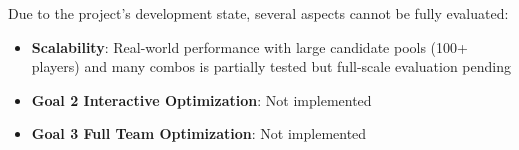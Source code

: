 Due to the project's development state, several aspects cannot be fully evaluated:

\begin{itemize}
    \item \textbf{Scalability}: Real-world performance with large candidate pools (100+ players) and many combos is partially tested but full-scale evaluation pending
    \item \textbf{Goal 2 Interactive Optimization}: Not implemented
    \item \textbf{Goal 3 Full Team Optimization}: Not implemented
\end{itemize}
